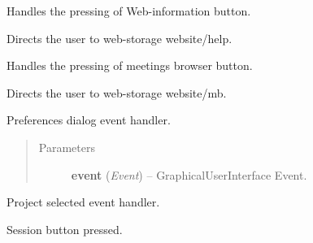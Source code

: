 \documentclass[letterpaper,10pt,english]{sphinxmanual}
\begin{document}
\begin{fulllineitems}
\begin{fulllineitems}
\label{diwacs:diwacs.GraphicalUserInterface.OnInfoBtn}
Handles the pressing of Web-information button.

Directs the user to web-storage website/help.

\end{fulllineitems}


\begin{fulllineitems}
\label{diwacs:diwacs.GraphicalUserInterface.OnMBBtn}
Handles the pressing of meetings browser button.

Directs the user to web-storage website/mb.

\end{fulllineitems}


\begin{fulllineitems}
\label{diwacs:diwacs.GraphicalUserInterface.OnPreferences}
Preferences dialog event handler.
\begin{quote}\begin{description}
\item[{Parameters}] \leavevmode
\textbf{event} (\emph{Event}) -- GraphicalUserInterface Event.

\end{description}\end{quote}

\end{fulllineitems}


\begin{fulllineitems}
\label{diwacs:diwacs.GraphicalUserInterface.OnProject}
Project selected event handler.

\end{fulllineitems}


\begin{fulllineitems}
\label{diwacs:diwacs.GraphicalUserInterface.OnSession}
Session button pressed.


\end{fulllineitems}
\end{fulllineitems}
\end{document}
